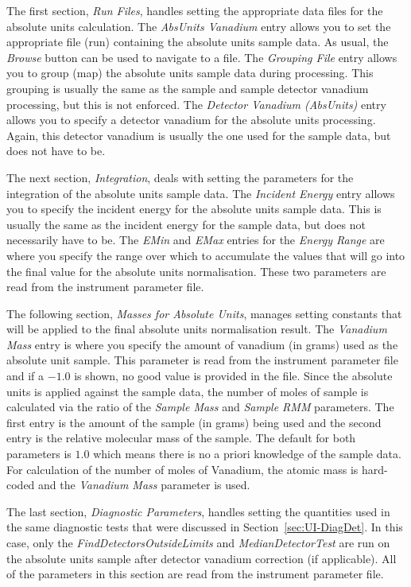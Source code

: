 The first section, \textit{Run Files}, handles setting the appropriate data files for the absolute units calculation. The \textit{AbsUnits Vanadium} entry allows you to set the appropriate file (run) containing the absolute units sample data. As usual, the \textit{Browse} button can be used to navigate to a file. The \textit{Grouping File} entry allows you to group (map) the absolute units sample data during processing. This grouping is usually the same as the sample and sample detector vanadium processing, but this is not enforced. The \textit{Detector Vanadium (AbsUnits)} entry allows you to specify a detector vanadium for the absolute units processing. Again, this detector vanadium is usually the one used for the sample data, but does not have to be. 

The next section, \textit{Integration}, deals with setting the parameters for the integration of the absolute units sample data. The \textit{Incident Energy} entry allows you to specify the incident energy for the absolute units sample data. This is usually the same as the incident energy for the sample data, but does not necessarily have to be. The \textit{EMin} and \textit{EMax} entries for the \textit{Energy Range} are where you specify the range over which to accumulate the values that will go into the final value for the absolute units normalisation. These two parameters are read from the instrument parameter file.

The following section, \textit{Masses for Absolute Units}, manages setting constants that will be applied to the final absolute units normalisation result. The \textit{Vanadium Mass} entry is where you specify the amount of vanadium (in grams) used as the absolute unit sample. This parameter is read from the instrument parameter file and if a $-1.0$ is shown, no good value is provided in the file. Since the absolute units is applied against the sample data, the number of moles of sample is calculated via the ratio of the \textit{Sample Mass} and \textit{Sample RMM} parameters. The first entry is the amount of the sample (in grams) being used and the second entry is the relative molecular mass of the sample. The default for both parameters is $1.0$ which means there is no a priori knowledge of the sample data. For calculation of the number of moles of Vanadium, the atomic mass is hard-coded and the \textit{Vanadium Mass} parameter is used.

The last section, \textit{Diagnostic Parameters}, handles setting the quantities used in the same diagnostic tests that were discussed in Section~\ref{sec:UI-DiagDet}. In this case, only the \textit{FindDetectorsOutsideLimits} and \textit{MedianDetectorTest} are run on the absolute units sample after detector vanadium correction (if applicable). All of the parameters in this section are read from the instrument parameter file.

